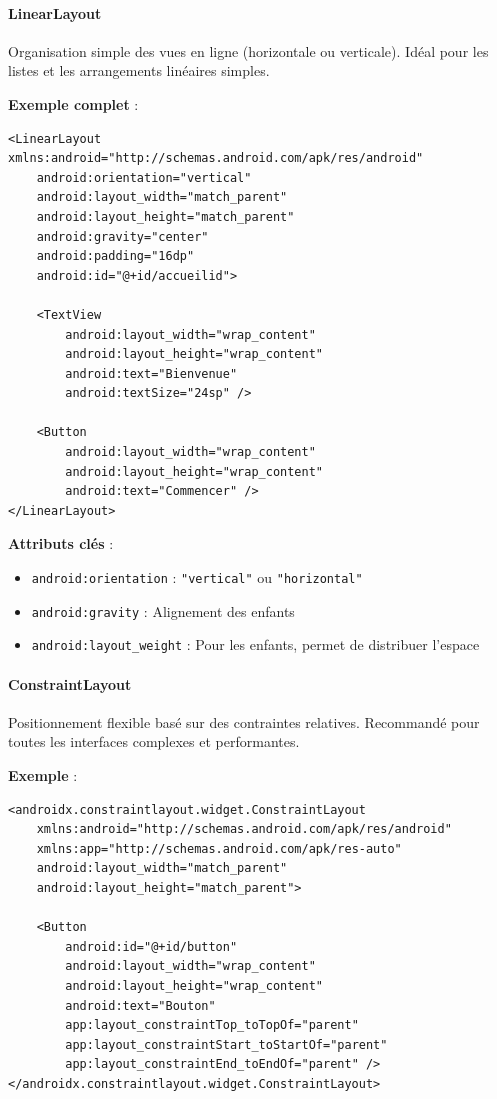 \documentclass[11pt,a4paper]{article}
\begin{document}
\paragraph{LinearLayout}

Organisation simple des vues en ligne (horizontale ou verticale). Idéal pour les listes et les arrangements linéaires simples.

\textbf{Exemple complet} :
\begin{lstlisting}[style=XML]
<LinearLayout xmlns:android="http://schemas.android.com/apk/res/android"
    android:orientation="vertical"
    android:layout_width="match_parent"
    android:layout_height="match_parent"
    android:gravity="center"
    android:padding="16dp"
    android:id="@+id/accueilid">
    
    <TextView
        android:layout_width="wrap_content"
        android:layout_height="wrap_content"
        android:text="Bienvenue"
        android:textSize="24sp" />
    
    <Button
        android:layout_width="wrap_content"
        android:layout_height="wrap_content"
        android:text="Commencer" />
</LinearLayout>
\end{lstlisting}

\textbf{Attributs clés} :
\begin{itemize}
    \item \texttt{android:orientation} : \texttt{"vertical"} ou \texttt{"horizontal"}
    \item \texttt{android:gravity} : Alignement des enfants
    \item \texttt{android:layout\_weight} : Pour les enfants, permet de distribuer l'espace
\end{itemize}

\paragraph{ConstraintLayout}

Positionnement flexible basé sur des contraintes relatives. Recommandé pour toutes les interfaces complexes et performantes.

\textbf{Exemple} :
\begin{lstlisting}[style=XML]
<androidx.constraintlayout.widget.ConstraintLayout
    xmlns:android="http://schemas.android.com/apk/res/android"
    xmlns:app="http://schemas.android.com/apk/res-auto"
    android:layout_width="match_parent"
    android:layout_height="match_parent">
    
    <Button
        android:id="@+id/button"
        android:layout_width="wrap_content"
        android:layout_height="wrap_content"
        android:text="Bouton"
        app:layout_constraintTop_toTopOf="parent"
        app:layout_constraintStart_toStartOf="parent"
        app:layout_constraintEnd_toEndOf="parent" />
</androidx.constraintlayout.widget.ConstraintLayout>
\end{lstlisting}
\end{document}
